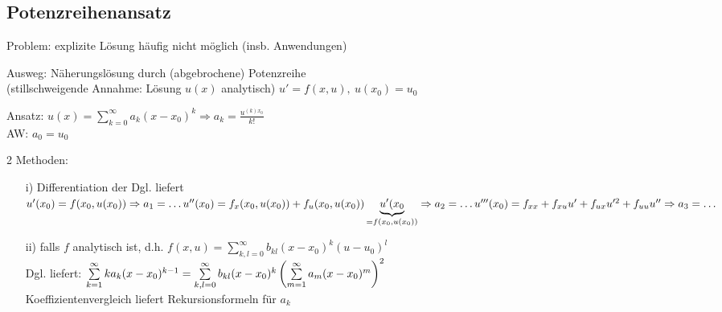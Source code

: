 \subsection{Potenzreihenansatz}
Problem: explizite Lösung häufig nicht möglich (insb. Anwendungen)

Ausweg: Näherungslösung durch (abgebrochene) Potenzreihe\\
(stillschweigende Annahme: Lösung $u(x)$ analytisch)
$u' = f(x,u), \ u(x_0) = u_0 $

Ansatz:
$u(x) = \sum\limits_{k=0}^{\infty} a_k (x-x_0)^k 
\Rightarrow a_k = \frac{u^{(k) x_0}}{k!} $\\
AW: $a_0 = u_0 $

2 Methoden:
\begin{itemize}
    \item[i)] Differentiation der Dgl. liefert\\
    $u'(x_0) = f(x_0, u(x_0)) \Rightarrow a_1 = \ldots \\
    u''(x_0) = f_x (x_0, u(x_0)) + f_u (x_0, u(x_0))
    \underbrace{u'(x_0}_{=f(x_0, u(x_0))}
    \Rightarrow a_2 = \ldots \\
    u'''(x_0) = f_{xx} + f_{xu} u' + f_{ux} u'^2 + f_{uu} u''
    \Rightarrow a_3 = \ldots
    $
    \item[ii)] falls $f$ analytisch ist, d.h.
    $f(x,u) = \sum\limits_{k,l = 0}^{\infty} b_{kl} (x-x_0)^k (u-u_0)^l $\\
    Dgl. liefert:
    $\sum\limits_{k=1}^{\infty} k a_k (x-x_0)^{k-1} \\
    = \sum\limits_{k,l = 0}^{\infty} b_{kl} (x-x_0)^k 
    \left( \sum\limits_{m=1}^{\infty} a_m (x-x_0)^m \right)^2 $\\
    Koeffizientenvergleich liefert Rekursionsformeln für $a_k$
\end{itemize}

